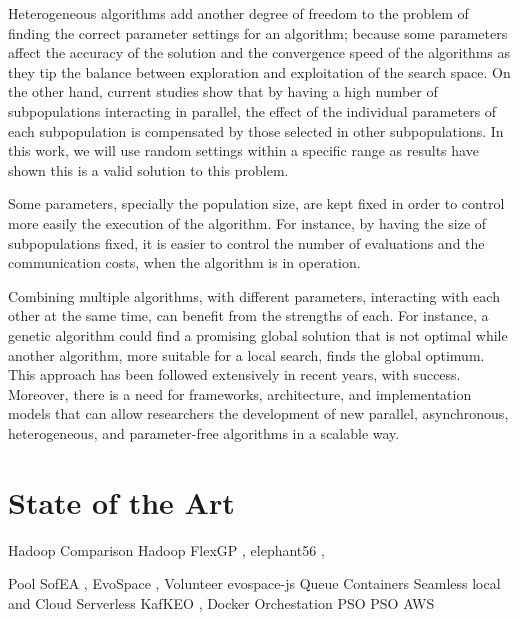 \documentclass[review]{elsarticle}
\begin{document}
Heterogeneous algorithms add another degree of freedom to the problem of finding
the correct parameter settings for an algorithm; because some parameters affect
the accuracy of the solution and the convergence speed of the algorithms as they
tip the balance between exploration and exploitation of the search space. On the
other hand, current studies show that by having a high number of subpopulations
interacting in parallel, the effect of the individual parameters of each
subpopulation is compensated by those selected in other
subpopulations. %
In this
work, we will use random settings within a specific range as results have shown
this is a valid solution to this problem. %

Some parameters, specially the population size, are
kept fixed in order to control more easily the execution of the algorithm. For
instance, by having the size of subpopulations fixed, it is easier to control
the number of evaluations and the communication costs, when the algorithm is in
operation. %

Combining multiple algorithms, with different parameters, interacting with each
other at the same time, can benefit from the strengths of each. For instance, a
genetic algorithm could find a promising global solution that is not optimal
while another algorithm, more suitable for a local search, finds the global
optimum. This approach has been followed extensively in recent years, with
success. %
Moreover, there is a need for frameworks, architecture, and
implementation models that can allow researchers the development of new
parallel, asynchronous, heterogeneous, and parameter-free algorithms in a scalable way.  

\section{State of the Art} 
\label{soa}
Hadoop 
    Comparison \cite{ferrucci2018using}
    Hadoop\cite{fazenda2012} 
    FlexGP \cite{FlexGP}, 
    elephant56 \cite{salza2016elephant56},

Pool
    SofEA \cite{merelo2012sofea,sofea:cec2012} , 
    EvoSpace \cite{garcia2015evospace},
Volunteer
    evospace-js \cite{garcia2017evospace}
Queue
    Containers \cite{valenzuela2015implementing} \cite{salza2016approach} 
    Seamless local and Cloud \cite{leclerc2016seamless}
    Serverless KafKEO \cite{guervos2018introducing}, 
    Docker Orchestation \cite{dziurzanski2020scalable,zhao2019cloud}
PSO 
    PSO AWS \cite{li2015parallel}
\end{document}
